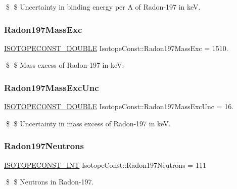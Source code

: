 \$ \$ Uncertainty in binding energy per A of Radon-\/197 in keV. \mbox{\label{group___isotope_const-_radon-_rn197_gaa77fd57b46a16ab32582d73748754188}} 
\subsubsection{\texorpdfstring{Radon197\+Mass\+Exc}{Radon197MassExc}}
{\footnotesize\ttfamily \mbox{\hyperlink{group___isotope_const-_macros_ga8f45a7272ce02c0b4c65c44636ed719a}{I\+S\+O\+T\+O\+P\+E\+C\+O\+N\+S\+T\+\_\+\+D\+O\+U\+B\+LE}} Isotope\+Const\+::\+Radon197\+Mass\+Exc = 1510.}

\$ \$ Mass excess of Radon-\/197 in keV. \mbox{\label{group___isotope_const-_radon-_rn197_gaf9ccbe46a58a72493118b8cec99b02d7}} 
\subsubsection{\texorpdfstring{Radon197\+Mass\+Exc\+Unc}{Radon197MassExcUnc}}
{\footnotesize\ttfamily \mbox{\hyperlink{group___isotope_const-_macros_ga8f45a7272ce02c0b4c65c44636ed719a}{I\+S\+O\+T\+O\+P\+E\+C\+O\+N\+S\+T\+\_\+\+D\+O\+U\+B\+LE}} Isotope\+Const\+::\+Radon197\+Mass\+Exc\+Unc = 16.}

\$ \$ Uncertainty in mass excess of Radon-\/197 in keV. \mbox{\label{group___isotope_const-_radon-_rn197_ga2920967aa21e074fd4df3c7c263375fc}} 
\subsubsection{\texorpdfstring{Radon197\+Neutrons}{Radon197Neutrons}}
{\footnotesize\ttfamily \mbox{\hyperlink{group___isotope_const-_macros_ga5f18360b3e99483a35c32d789e62621c}{I\+S\+O\+T\+O\+P\+E\+C\+O\+N\+S\+T\+\_\+\+I\+NT}} Isotope\+Const\+::\+Radon197\+Neutrons = 111}

\$ \$ Neutrons in Radon-\/197. \mbox{\label{group___isotope_const-_radon-_rn197_ga9c38625ffcd8e6b2e7fef6b23da76982}} 
